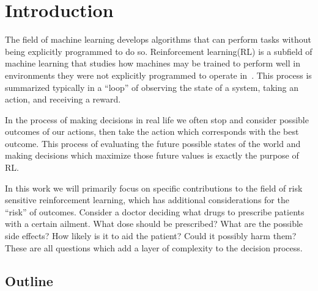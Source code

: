 \chapter{Introduction}\label{ch:intro}

The field of machine learning develops algorithms that can perform tasks without being explicitly programmed to do so. Reinforcement learning(RL) is a subfield of machine learning that studies how machines may be trained to perform well in environments they were not explicitly programmed to operate in~\cite{Sutton1998}. This process is summarized typically in a ``loop'' of observing the state of a system, taking an action, and receiving a reward.

In the process of making decisions in real life we often stop and consider possible outcomes of our actions, then take the action which corresponds with the best outcome. This process of evaluating the future possible states of the world and making decisions which maximize those future values is exactly the purpose of RL.

In this work we will primarily focus on specific contributions to the field of risk sensitive reinforcement learning, which has additional considerations for the ``risk'' of outcomes. Consider a doctor deciding what drugs to prescribe patients with a certain ailment. What dose should be prescribed? What are the possible side effects? How likely is it to aid the patient? Could it possibly harm them? These are all questions which add a layer of complexity to the decision process.

\section{Outline}

